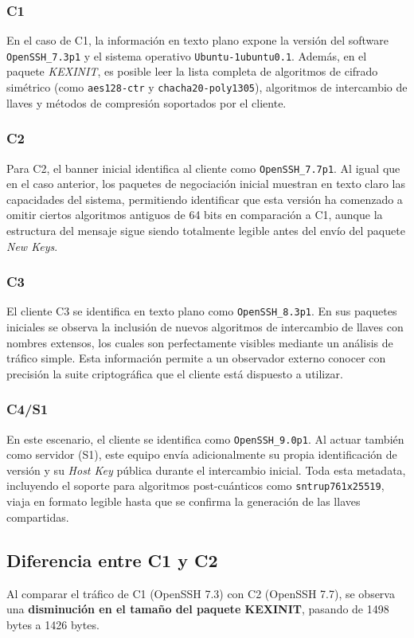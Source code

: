 \documentclass[letter,12pt]{article}
\begin{document}
\subsubsection{C1}
En el caso de C1, la información en texto plano expone la versión del software \texttt{OpenSSH\_7.3p1} y el sistema operativo \texttt{Ubuntu-1ubuntu0.1}. Además, en el paquete \textit{KEXINIT}, es posible leer la lista completa de algoritmos de cifrado simétrico (como \texttt{aes128-ctr} y \texttt{chacha20-poly1305}), algoritmos de intercambio de llaves y métodos de compresión soportados por el cliente.

\subsubsection{C2}
Para C2, el banner inicial identifica al cliente como \texttt{OpenSSH\_7.7p1}. Al igual que en el caso anterior, los paquetes de negociación inicial muestran en texto claro las capacidades del sistema, permitiendo identificar que esta versión ha comenzado a omitir ciertos algoritmos antiguos de 64 bits en comparación a C1, aunque la estructura del mensaje sigue siendo totalmente legible antes del envío del paquete \textit{New Keys}.

\subsubsection{C3}
El cliente C3 se identifica en texto plano como \texttt{OpenSSH\_8.3p1}. En sus paquetes iniciales se observa la inclusión de nuevos algoritmos de intercambio de llaves con nombres extensos, los cuales son perfectamente visibles mediante un análisis de tráfico simple. Esta información permite a un observador externo conocer con precisión la suite criptográfica que el cliente está dispuesto a utilizar.

\subsubsection{C4/S1}
En este escenario, el cliente se identifica como \texttt{OpenSSH\_9.0p1}. Al actuar también como servidor (S1), este equipo envía adicionalmente su propia identificación de versión y su \textit{Host Key} pública durante el intercambio inicial. Toda esta metadata, incluyendo el soporte para algoritmos post-cuánticos como \texttt{sntrup761x25519}, viaja en formato legible hasta que se confirma la generación de las llaves compartidas.

\subsection{Diferencia entre C1 y C2}
Al comparar el tráfico de C1 (OpenSSH 7.3) con C2 (OpenSSH 7.7), se observa una \textbf{disminución en el tamaño del paquete KEXINIT}, pasando de 1498 bytes a 1426 bytes. 
\end{document}
